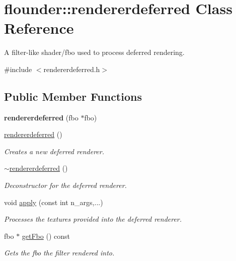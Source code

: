 \hypertarget{classflounder_1_1rendererdeferred}{}\section{flounder\+:\+:rendererdeferred Class Reference}
\label{classflounder_1_1rendererdeferred}


A filter-\/like shader/fbo used to process deferred rendering.  




{\ttfamily \#include $<$rendererdeferred.\+h$>$}

\subsection*{Public Member Functions}
\begin{DoxyCompactItemize}
\item 
\mbox{\label{classflounder_1_1rendererdeferred_a40cbd82942eb297a096d3c398e1314d9}} 
{\bfseries rendererdeferred} (fbo $\ast$fbo)
\item 
\hyperlink{classflounder_1_1rendererdeferred_aa67e98fb7b0a6932b617c8bd72c4d9f9}{rendererdeferred} ()
\begin{DoxyCompactList}\small\item\em Creates a new deferred renderer. \end{DoxyCompactList}\item 
\hyperlink{classflounder_1_1rendererdeferred_a19089186580357193ca2dfdcdaf27348}{$\sim$rendererdeferred} ()
\begin{DoxyCompactList}\small\item\em Deconstructor for the deferred renderer. \end{DoxyCompactList}\item 
void \hyperlink{classflounder_1_1rendererdeferred_a5edd3f17731e1accfb0f8e11103585a4}{apply} (const int n\+\_\+args,...)
\begin{DoxyCompactList}\small\item\em Processes the textures provided into the deferred renderer. \end{DoxyCompactList}\item 
fbo $\ast$ \hyperlink{classflounder_1_1rendererdeferred_a30239e1417ec3a2b0c61e4180e1b05d2}{get\+Fbo} () const
\begin{DoxyCompactList}\small\item\em Gets the fbo the filter rendered into. \end{DoxyCompactList}\end{DoxyCompactItemize}
